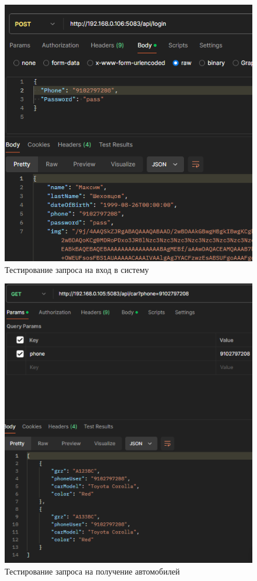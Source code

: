 \begin{figure}[H]
	\centering
	\includegraphics[width=0.6\linewidth]{images/test1}
	\caption{Тестирование запроса на вход в систему}
	\label{fig:test1}
\end{figure}

\begin{figure}[H]
	\centering
	\includegraphics[width=0.6\linewidth]{images/test2}
	\caption{Тестирование запроса на получение автомобилей}
	\label{fig:test2}
\end{figure}

